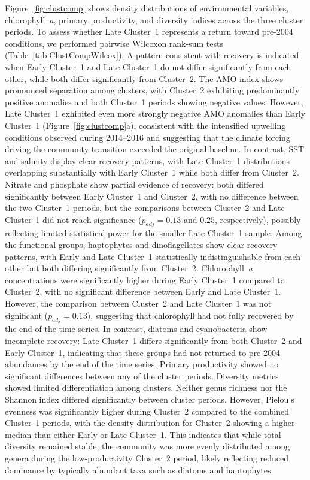 \documentclass[]{agujournal2019}
\begin{document}
    Figure~\ref{fig:clustcomp} shows density distributions of environmental variables, chlorophyll~\textit{a}, primary productivity, and diversity indices across the three cluster periods. To assess whether Late Cluster~1 represents a return toward pre-2004 conditions, we performed pairwise Wilcoxon rank-sum tests (Table~\ref{tab:ClustCompWilcox}). A pattern consistent with recovery is indicated when Early Cluster~1 and Late Cluster~1 do not differ significantly from each other, while both differ significantly from Cluster~2.
    The AMO index shows pronounced separation among clusters, with Cluster~2 exhibiting predominantly positive anomalies and both Cluster~1 periods showing negative values. However, Late Cluster~1 exhibited even more strongly negative AMO anomalies than Early Cluster~1 (Figure~\ref{fig:clustcomp}a), consistent with the intensified upwelling conditions observed during 2014--2016 and suggesting that the climate forcing driving the community transition exceeded the original baseline. In contrast, SST and salinity display clear recovery patterns, with Late Cluster~1 distributions overlapping substantially with Early Cluster~1 while both differ from Cluster~2. Nitrate and phosphate show partial evidence of recovery: both differed significantly between Early Cluster~1 and Cluster~2, with no difference between the two Cluster~1 periods, but the comparisons between Cluster~2 and Late Cluster~1 did not reach significance ($p_{adj} = 0.13$ and $0.25$, respectively), possibly reflecting limited statistical power for the smaller Late Cluster~1 sample.
    Among the functional groups, haptophytes and dinoflagellates show clear recovery patterns, with Early and Late Cluster~1 statistically indistinguishable from each other but both differing significantly from Cluster~2. Chlorophyll~\textit{a} concentrations were significantly higher during Early Cluster~1 compared to Cluster~2, with no significant difference between Early and Late Cluster~1. However, the comparison between Cluster~2 and Late Cluster~1 was not significant ($p_{adj} = 0.13$), suggesting that chlorophyll had not fully recovered by the end of the time series. In contrast, diatoms and cyanobacteria show incomplete recovery: Late Cluster~1 differs significantly from both Cluster~2 and Early Cluster~1, indicating that these groups had not returned to pre-2004 abundances by the end of the time series. Primary productivity showed no significant differences between any of the cluster periods.
    Diversity metrics showed limited differentiation among clusters. Neither genus richness nor the Shannon index differed significantly between cluster periods. However, Pielou's evenness was significantly higher during Cluster~2 compared to the combined Cluster~1 periods, with the density distribution for Cluster~2 showing a higher median than either Early or Late Cluster~1. This indicates that while total diversity remained stable, the community was more evenly distributed among genera during the low-productivity Cluster~2 period, likely reflecting reduced dominance by typically abundant taxa such as diatoms and haptophytes.
 
\end{document}

